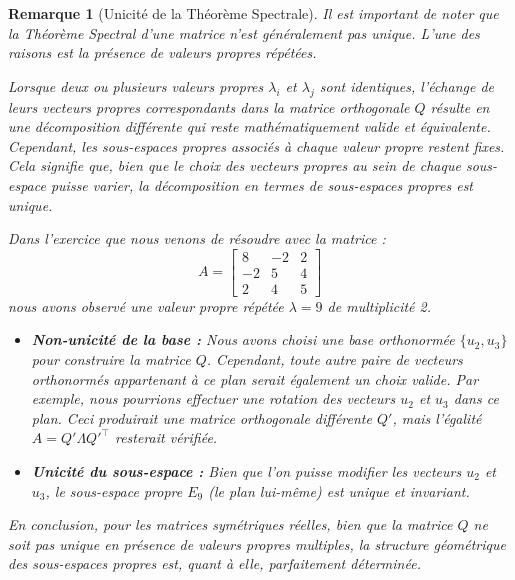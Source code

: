 \documentclass[12pt]{report}
\newtheorem{remark}{Remarque}
\begin{document}
\begin{remark}[Unicité de la Théorème Spectrale]
    \noindent Il est important de noter que la Théorème Spectral d'une matrice n'est généralement pas unique. L'une des raisons est la présence de valeurs propres répétées.

    \noindent Lorsque deux ou plusieurs valeurs propres $\lambda_i$ et $\lambda_j$ sont identiques, l'échange de leurs vecteurs propres correspondants dans la matrice orthogonale $Q$ résulte en une décomposition différente qui reste mathématiquement valide et équivalente.
    Cependant, les \textit{sous-espaces propres} associés à chaque valeur propre restent fixes. Cela signifie que, bien que le choix des vecteurs propres au sein de chaque sous-espace puisse varier, la décomposition en termes de sous-espaces propres est unique.

    \noindent Dans l'exercice que nous venons de résoudre avec la matrice :
    \[
        A = \begin{bmatrix}
            8  & -2 & 2 \\
            -2 & 5  & 4 \\
            2  & 4  & 5
        \end{bmatrix}
    \]
    nous avons observé une valeur propre répétée $\lambda = 9$ de multiplicité 2.
    \begin{itemize}
        \item \textbf{Non-unicité de la base :} Nous avons choisi une base orthonormée $\{u_2, u_3\}$ pour construire la matrice $Q$. Cependant, toute autre paire de vecteurs orthonormés appartenant à ce plan serait également un choix valide. Par exemple, nous pourrions effectuer une rotation des vecteurs $u_2$ et $u_3$ dans ce plan. Ceci produirait une matrice orthogonale différente $Q'$, mais l'égalité $A = Q'\Lambda Q'^\top$ resterait vérifiée.

        \item \textbf{Unicité du sous-espace :} Bien que l'on puisse modifier les vecteurs $u_2$ et $u_3$, le sous-espace propre $E_9$ (le plan lui-même) est unique et invariant.
    \end{itemize}

    \noindent En conclusion, pour les matrices symétriques réelles, bien que la matrice $Q$ ne soit pas unique en présence de valeurs propres multiples, la structure géométrique des sous-espaces propres est, quant à elle, parfaitement déterminée.
\end{remark}
\end{document}
